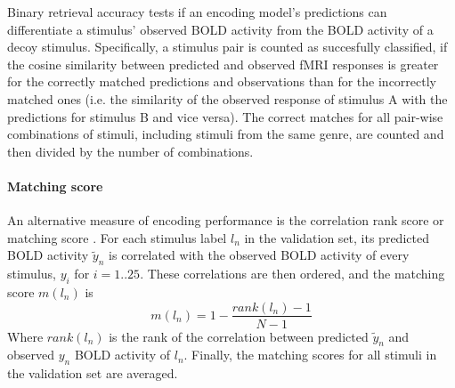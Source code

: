 Binary retrieval accuracy \citep{ML08} tests if an encoding model's predictions
can differentiate a stimulus' observed BOLD activity from the BOLD activity
of a decoy stimulus.
Specifically, a stimulus pair is counted as succesfully classified, if the cosine similarity between predicted and
observed f{MRI} responses is greater for the correctly matched predictions and
observations than for the incorrectly matched ones (i.e. the similarity of the observed response of
stimulus A with the predictions for stimulus B and vice versa).
The correct matches for all pair-wise combinations of stimuli, including stimuli from the
same genre, are counted and then divided by the number of combinations.

\paragraph{Matching score}
%
An alternative measure of encoding performance is the correlation rank score or
matching score \citep{SF14}. For each stimulus label $l_{n}$ in the validation set,
its predicted BOLD activity $\widetilde{y}_{n}$ is correlated with the
observed BOLD activity of every stimulus, $y_{i}$ for $i=1..25$. These
correlations are then ordered, and the  matching score $m(l_{n})$ is \[
m(l_{n}) = 1-\frac{rank(l_{n})-1}{N-1} \] Where $rank(l_{n})$ is the rank of
the correlation between predicted $\widetilde{y}_{n}$ and observed $y_{n}$
BOLD activity of $l_{n}$. Finally, the matching scores for all stimuli in the
validation set are averaged.



